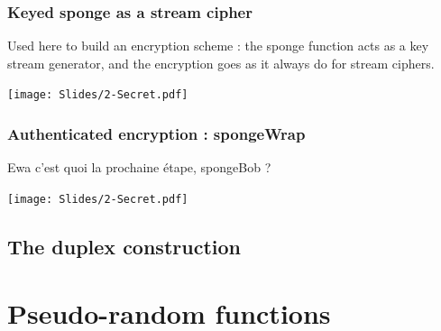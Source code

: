 \documentclass[../Cryptography.tex]{subfiles}
\begin{document}
\subsubsection{Keyed sponge as a stream cipher}
Used here to build an encryption scheme : the sponge function acts as a key stream generator, and the encryption goes as it always do for stream ciphers.
\begin{center}
    \texttt{[image: Slides/2-Secret.pdf]}
\end{center}
\subsubsection{Authenticated encryption : spongeWrap}
Ewa c'est quoi la prochaine étape, spongeBob ?
\begin{center}
    \texttt{[image: Slides/2-Secret.pdf]}
\end{center}

\subsection{The duplex construction}


\section{Pseudo-random functions}
\end{document}
